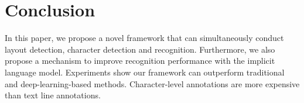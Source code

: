 
\section{Conclusion}
In this paper, we propose a novel framework that can simultaneously conduct layout detection, character detection and recognition.
Furthermore, we also propose a mechanism to improve recognition performance with the implicit language model.
Experiments show our framework can outperform traditional and deep-learning-based methods. Character-level annotations are more expensive than text line annotations. 
